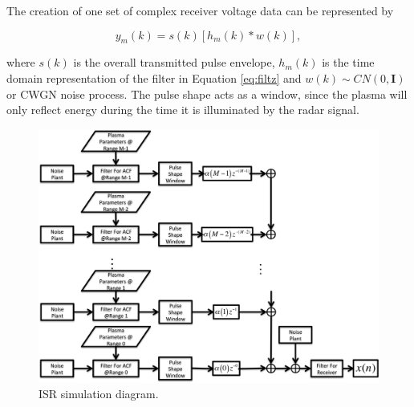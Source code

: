 \documentclass[draft,ras]{agutex}
\begin{document}
\begin{article}
The creation of one set of complex receiver voltage data can be represented by

\begin{equation}
\label{eq2}
y_m (k)= s(k)\left[h_m(k)*w(k)\right],
\end{equation}
 
\noindent where $s(k)$ is the overall transmitted pulse envelope, $h_m(k)$ is the time domain representation of the filter in Equation \ref{eq:filtz} and $w(k)\sim CN(0,\mathbf{I})$ or CWGN noise process. The pulse shape acts as a window, since the plasma will only reflect energy during the time it is illuminated by the radar signal. 

%

\begin{figure}[!h]
\centering
\includegraphics[width=7.0in]{diagram}
\caption{ISR simulation diagram.}
\label{fig:isrdiag}
\end{figure}



\end{article}
\end{document}
